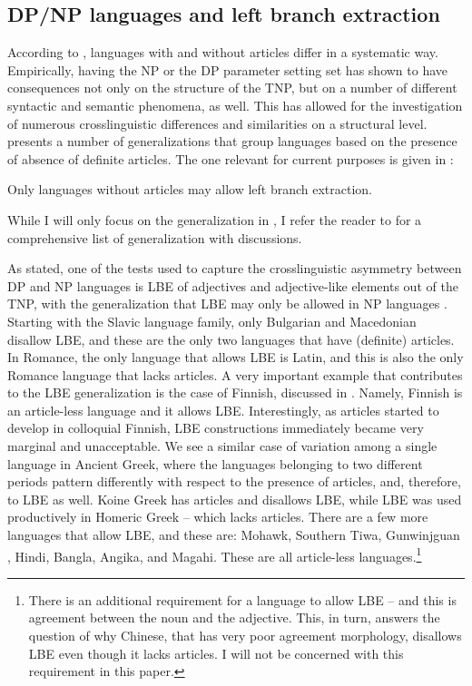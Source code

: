 \documentclass[output=paper,
hidelinks,
newtxmath,
]{langscibook}
\begin{document}
\subsection{DP/NP languages and left branch extraction}\label{s3.2}

According to \citet{Boskovic2008,Boskovic2012}, languages with and without articles differ in a systematic way. Empirically, having the NP or the DP parameter setting set has shown to have consequences not only on the structure of the TNP, but on a number of different syntactic and semantic phenomena, as well. This has allowed for the investigation of numerous crosslinguistic differences and similarities on a structural level. \citet{Boskovic2008,Boskovic2012} presents a number of generalizations that group languages based on the presence of absence of definite articles. The one relevant for current purposes is given in :

\ea\label{ex1}
  Only languages without articles may allow left branch extraction.
\z

\noindent While I will only focus on the generalization in , I refer the reader to \citet{Boskovic2008,Boskovic2012} for a comprehensive list of generalization with discussions.

As stated, one of the tests used to capture the crosslinguistic asymmetry between DP and NP languages is LBE of adjectives and adjective-like elements out of the TNP, with the generalization that LBE may only be allowed in NP languages \citet{Boskovic2008,Boskovic2012}. Starting with the Slavic language family, only Bulgarian and Macedonian disallow LBE, and these are the only two languages that have (definite) articles. In Romance, the only language that allows LBE is Latin, and this is also the only Romance language that lacks articles. A very important example that contributes to the LBE generalization is the case of Finnish, discussed in \citet{Franks2007}. Namely, Finnish is an article-less language and it allows LBE. Interestingly, as articles started to develop in colloquial Finnish, LBE constructions immediately became very marginal and unacceptable. We see a similar case of variation among a single language in Ancient Greek, where the languages belonging to two different periods pattern differently with respect to the presence of articles, and, therefore, to LBE as well. Koine Greek has articles and disallows LBE, while LBE was used productively in Homeric Greek – which lacks articles. There are a few more languages that allow LBE, and these are: Mohawk, Southern Tiwa, Gunwinjguan \citep{Baker1996}, Hindi, Bangla, Angika, and Magahi. These are all article-less languages.\largerpage\footnote{\label{fn2}There is an additional requirement for a language to allow LBE -- and this is agreement between the noun and the adjective. This, in turn, answers the question of why Chinese, that has very poor agreement morphology, disallows LBE even though it lacks articles. I will not be concerned with this requirement in this paper.}
\end{document}
